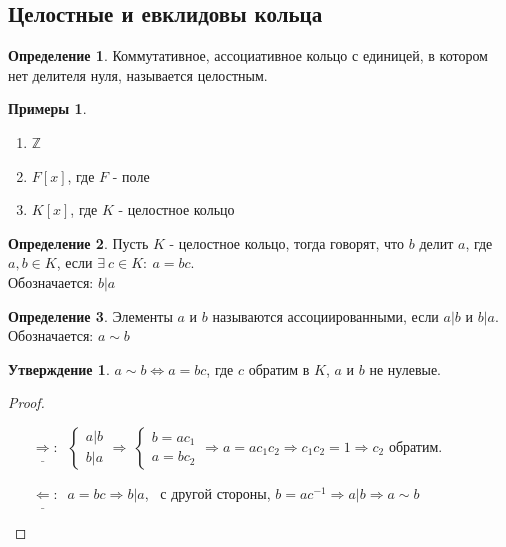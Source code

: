 \documentclass[a4paper, 12pt]{article}
\newcommand{\Z}{\mathbb Z}
\newcommand\tab[1][.5cm]{\hspace*{#1}}
\theoremstyle{definition}
\newtheorem*{definition}{Определение}
\newtheorem*{subtheorem}{Утверждение}
\newtheorem*{example}{Примеры}
\begin{document}
  \subsection{Целостные и евклидовы кольца}
  \begin{definition}
    Коммутативное, ассоциативное кольцо с единицей, в котором нет делителя нуля, называется целостным.
  \end{definition}
  \begin{example}\tab
    \begin{enumerate}
      \item $\Z$
      \item $F[x]$, где $F$ - поле
      \item $K[x]$, где $K$ - целостное кольцо     
    \end{enumerate}
  \end{example}
  \begin{definition}
    Пусть $K$ - целостное кольцо, тогда говорят, что $b$ делит $a$, где $a,b \in K$, если $\exists \ c \in K: \ a = bc$.\\
    Обозначается: $b|a$ 
  \end{definition}
  \begin{definition}
    Элементы $a$ и $b$ называются ассоциированными, если $a|b$ и $b|a$.\\
    Обозначается: $a \sim  b$ 
  \end{definition}
  \begin{subtheorem}
    $a\sim b \Longleftrightarrow a = bc$, где $c$ обратим в $K$, $a$ и $b$ не нулевые.   
  \end{subtheorem}
  \begin{proof}\tab
    \begin{itemize}
      \item[$\underline{\Longrightarrow }: \ $] $\begin{cases}
        a|b\\
        b|a
      \end{cases} \Longrightarrow \ \begin{cases}
        b = ac_1\\
        a = bc_2
      \end{cases} \Longrightarrow a = ac_1c_2 \Longrightarrow c_1c_2 =1 \Longrightarrow c_2$ обратим.
      \item[$\underline{\Longleftarrow}: \ $] $a=bc \Longrightarrow b|a$, \ с другой стороны, $b = ac^{-1} \Longrightarrow  a|b \Longrightarrow a \sim b$ 
    \end{itemize}
  \end{proof}
\end{document}
